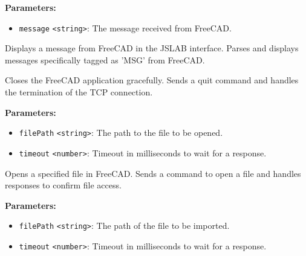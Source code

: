 \documentclass[12pt,a4paper]{article}
\begin{document}
\vspace{5mm}
\noindent {}


\noindent \textbf{Parameters:}
\begin{itemize}
  \item \texttt{message} \texttt{<string>}: The message received from FreeCAD.
\end{itemize}

\noindent Displays a message from FreeCAD in the JSLAB interface.
Parses and displays messages specifically tagged as 'MSG' from FreeCAD.

\vspace{5mm}
\noindent {}


\noindent Closes the FreeCAD application gracefully.
Sends a quit command and handles the termination of the TCP connection.

\vspace{5mm}
\noindent {}


\noindent \textbf{Parameters:}
\begin{itemize}
  \item \texttt{filePath} \texttt{<string>}: The path to the file to be opened.
  \item \texttt{timeout} \texttt{<number>}: Timeout in milliseconds to wait for a response.
\end{itemize}

\noindent Opens a specified file in FreeCAD.
Sends a command to open a file and handles responses to confirm file access.

\vspace{5mm}
\noindent {}


\noindent \textbf{Parameters:}
\begin{itemize}
  \item \texttt{filePath} \texttt{<string>}: The path of the file to be imported.
  \item \texttt{timeout} \texttt{<number>}: Timeout in milliseconds to wait for a response.
\end{itemize}
\end{document}
